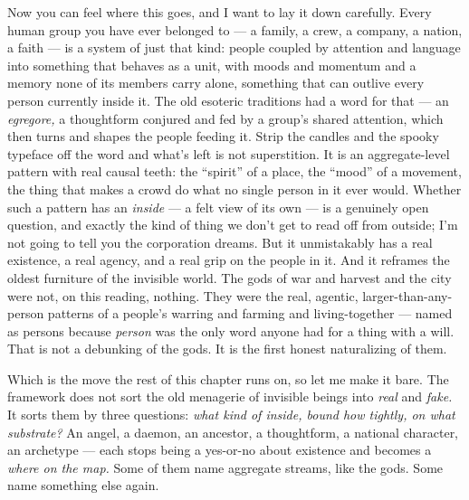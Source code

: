 \documentclass[11pt,openany]{book}
\begin{document}
Now you can feel where this goes, and I want to lay it down carefully. Every human group you have ever belonged to — a family, a crew, a company, a nation, a faith — is a system of just that kind: people coupled by attention and language into something that behaves as a unit, with moods and momentum and a memory none of its members carry alone, something that can outlive every person currently inside it. The old esoteric traditions had a word for that — an \textit{egregore,} a thoughtform conjured and fed by a group’s shared attention, which then turns and shapes the people feeding it. Strip the candles and the spooky typeface off the word and what’s left is not superstition. It is an aggregate-level pattern with real causal teeth: the “spirit” of a place, the “mood” of a movement, the thing that makes a crowd do what no single person in it ever would. Whether such a pattern has an \textit{inside} — a felt view of its own — is a genuinely open question, and exactly the kind of thing we don’t get to read off from outside; I’m not going to tell you the corporation dreams. But it unmistakably has a real existence, a real agency, and a real grip on the people in it. And it reframes the oldest furniture of the invisible world. The gods of war and harvest and the city were not, on this reading, nothing. They were the real, agentic, larger-than-any-person patterns of a people’s warring and farming and living-together — named as persons because \textit{person} was the only word anyone had for a thing with a will. That is not a debunking of the gods. It is the first honest naturalizing of them.

Which is the move the rest of this chapter runs on, so let me make it bare. The framework does not sort the old menagerie of invisible beings into \textit{real} and \textit{fake.} It sorts them by three questions: \textit{what kind of inside, bound how tightly, on what substrate?} An angel, a daemon, an ancestor, a thoughtform, a national character, an archetype — each stops being a yes-or-no about existence and becomes a \textit{where on the map.} Some of them name aggregate streams, like the gods. Some name something else again.
\end{document}
